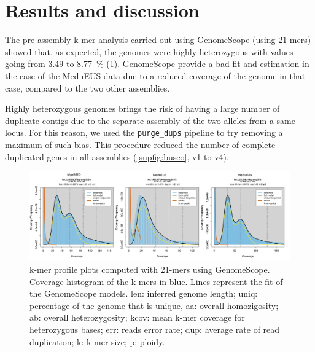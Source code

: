 \documentclass[11pt, a4paper]{article}
\begin{document}


\section{Results and discussion}

The pre-assembly k-mer analysis carried out using GenomeScope (using 21-mers) showed that, as expected, the genomes were highly heterozygous with values going from 3.49 to 8.77~\% (\cref{fig:genomescope}).
GenomeScope provide a bad fit and estimation in the case of the MeduEUS data due to a reduced coverage of the genome in that case, compared to the two other assemblies.

Highly heterozygous genomes brings the risk of having a large number of duplicate contigs due to the separate assembly of the two alleles from a same locus.
For this reason, we used the \texttt{purge\_dups} pipeline to try removing a maximum of such bias.
This procedure reduced the number of complete duplicated genes in all assemblies (\cref{supfig:busco}, v1 to v4).

\begin{figure}[h]
	\includegraphics[width=\linewidth]{figures/Fig1_genomescope.pdf}
	\caption{k-mer profile plots computed with 21-mers using GenomeScope.
		Coverage histogram of the k-mers in blue.
		Lines represent the fit of the GenomeScope models.
		len: inferred genome length; uniq: percentage of the genome that is unique, aa: overall homozigosity; ab: overall heterozygosity; kcov: mean k-mer coverage for heterozygous bases; err: reads error rate; dup: average rate of read duplication; k: k-mer size; p: ploidy.
	}
	\label{fig:genomescope}
\end{figure}
\end{document}
